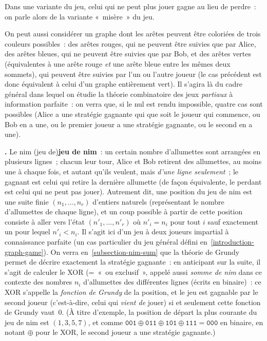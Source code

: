 \documentclass[12pt,a4paper]{article}
\theoremstyle{definition}
\newcommand\thingy{%
\refstepcounter{comcnt}\smallskip\noindent\textbf{\thecomcnt.} }
\newcommand{\defin}[2][]{\def\latexsucks{#1}\ifx\latexsucks\empty\index{#2}\else\index{\latexsucks}\fi\textbf{#2}}
\begin{document}
Dans une variante du jeu, celui qui ne peut plus jouer gagne au lieu
de perdre : on parle alors de la variante « misère » du jeu.

On peut aussi considérer un graphe dont les arêtes peuvent être
coloriées de trois couleurs possibles : des arêtes rouges, qui ne
peuvent être suivies que par Alice, des arêtes bleues, qui ne peuvent
être suivies que par Bob, et des arêtes vertes (équivalentes à une
arête rouge \emph{et} une arête bleue entre les mêmes deux sommets),
qui peuvent être suivies par l'un ou l'autre joueur (le cas précédent
est donc équivalent à celui d'un graphe entièrement vert).  Il s'agira
là du cadre général dans lequel on étudie la théorie combinatoire des
jeux \emph{partiaux} à information parfaite : on verra que, si le nul
est rendu impossible, quatre cas sont possibles (Alice a une stratégie
gagnante qui que soit le joueur qui commence, ou Bob en a une, ou le
premier joueur a une stratégie gagnante, ou le second en a une).

\thingy\label{introduction-nim-game} Le \defin[nim (jeu de)]{jeu de nim} : un
certain nombre d'allumettes sont
arrangées en plusieurs lignes ; chacun leur tour, Alice et Bob
retirent des allumettes, au moins une à chaque fois, et autant qu'ils
veulent, mais \emph{d'une ligne seulement} ; le gagnant est celui qui
retire la dernière allumette (de façon équivalente, le perdant est
celui qui ne peut pas jouer).  Autrement dit, une position du jeu de
nim est une suite finie $(n_1,\ldots,n_r)$ d'entiers naturels
(représentant le nombre d'allumettes de chaque ligne), et un coup
possible à partir de cette position consiste à aller vers l'état
$(n'_1,\ldots,n'_r)$ où $n'_i = n_i$ pour tout $i$ sauf exactement un
pour lequel $n'_i < n_i$.  Il s'agit ici d'un jeu à deux joueurs
impartial à connaissance parfaite (un cas particulier du jeu général
défini en \ref{introduction-graph-game}).  On verra en \ref{subsection-nim-sum} que la théorie de
Grundy permet de décrire exactement la stratégie gagnante : en
anticipant sur la suite, il s'agit de calculer le XOR (= « ou
  exclusif », appelé aussi \textit{somme de nim} dans ce contexte des
nombres $n_i$ d'allumettes des différentes lignes (écrits en
binaire) : ce XOR s'appelle la \textit{fonction de Grundy} de la
position, et le jeu est gagnable par le second joueur (c'est-à-dire,
celui qui \emph{vient de} jouer) si et seulement cette fonction de
Grundy vaut $0$.  (À titre d'exemple, la position de départ la plus
courante du jeu de nim est $(1,3,5,7)$, et comme $\mathtt{001} \oplus
\mathtt{011} \oplus \mathtt{101} \oplus \mathtt{111} = \mathtt{000}$
en binaire, en notant $\oplus$ pour le XOR, le second joueur a une
stratégie gagnante.)
\end{document}
